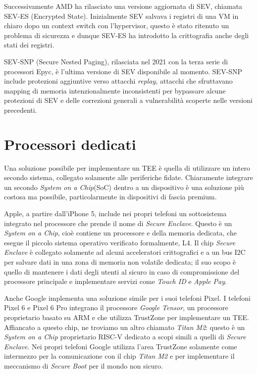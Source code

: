 \documentclass[12pt,italian]{report}
\begin{document}
Successivamente AMD ha rilasciato una versione aggiornata di SEV, chiamata
SEV-ES (Encrypted State)\cite{sev_es}. Inizialmente SEV salvava i registri
di una VM in chiaro dopo un context switch con l'hypervisor, questo è
stato ritenuto un problema di sicurezza e dunque SEV-ES ha introdotto la
crittografia anche degli stati dei registri.

SEV-SNP (Secure Nested Paging)\cite{sev_snp}, rilasciata nel 2021
con la terza serie di processori Epyc, è l'ultima versione di SEV
disponibile al momento.
SEV-SNP include protezioni aggiuntive verso
attacchi \textit{replay}, attacchi che sfruttavano mapping di memoria
intenzionalmente inconsistenti per bypassare alcune protezioni di SEV
e delle correzioni generali a vulnerabilità scoperte nelle versioni 
precedenti.

\section{Processori dedicati}
\label{sec:processori-dedicati}
Una soluzione possibile per implementare un TEE è quella di utilizzare
un intero secondo sistema, collegato solamente alle periferiche fidate.
Chiaramente integrare un secondo \textit{System on a Chip}(SoC) dentro
a un dispositivo è una soluzione più costosa ma possibile, particolarmente
in dispositivi di fascia premium.

\bigbreak \noindent

Apple, a partire dall'iPhone 5, include nei propri telefoni un sottosistema
integrato nel processore che prende il nome di
\textit{Secure Enclave}.
Questo è un \textit{System on a Chip}, cioè contiene un processore
e della memoria dedicata, che esegue il piccolo sistema operativo verificato
formalmente, L4\cite{secure_enclave}.
Il chip \textit{Secure Enclave} è collegato solamente ad alcuni
acceleratori crittografici e a un bus I2C per salvare dati in una zona di
memoria non volatile dedicata; il suo scopo è quello di mantenere i dati
degli utenti al sicuro in caso di compromissione del processore principale
e implementare servizi come \textit{Touch ID} e \textit{Apple Pay}.

\bigbreak \noindent
Anche Google implementa una soluzione simile per i suoi telefoni Pixel.
I telefoni Pixel 6 e Pixel 6 Pro integrano il processore
\textit{Google Tensor}, un processore proprietario basato su ARM e che
utilizza TrustZone per implementare un TEE.
Affiancato a questo chip, ne troviamo un altro chiamato \textit{Titan M2}:
questo è un \textit{System on a Chip} proprietario RISC-V dedicato a
scopi simili a quelli di \textit{Secure Enclave}.   
Nei propri telefoni Google utilizza l'area TrustZone solamente come
intermezzo per la comunicazione con il chip \textit{Titan M2} e per
implementare il meccanismo di \textit{Secure Boot} per il mondo
non sicuro.
\end{document}
